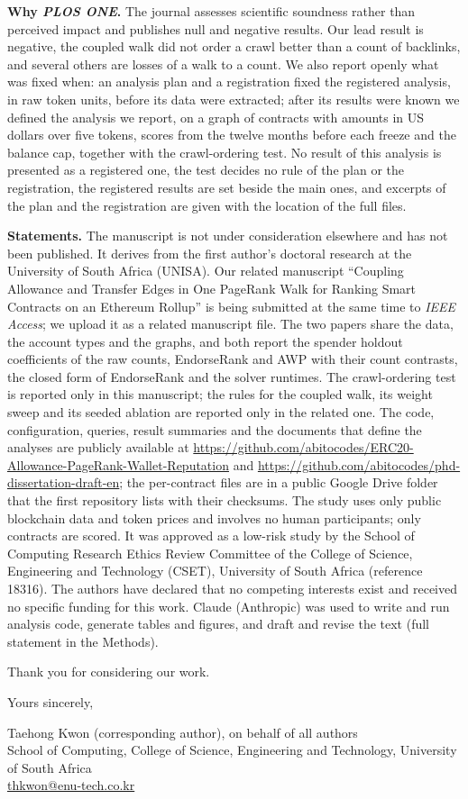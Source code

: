 \documentclass[11pt,a4paper]{article}
\begin{document}
\textbf{Why \textit{PLOS ONE}.} The journal assesses scientific soundness rather than perceived impact and publishes null and negative results. Our lead result is negative, the coupled walk did not order a crawl better than a count of backlinks, and several others are losses of a walk to a count. We also report openly what was fixed when: an analysis plan and a registration fixed the registered analysis, in raw token units, before its data were extracted; after its results were known we defined the analysis we report, on a graph of contracts with amounts in US dollars over five tokens, scores from the twelve months before each freeze and the balance cap, together with the crawl-ordering test. No result of this analysis is presented as a registered one, the test decides no rule of the plan or the registration, the registered results are set beside the main ones, and excerpts of the plan and the registration are given with the location of the full files.

\textbf{Statements.} The manuscript is not under consideration elsewhere and has not been published. It derives from the first author's doctoral research at the University of South Africa (UNISA). Our related manuscript ``Coupling Allowance and Transfer Edges in One PageRank Walk for Ranking Smart Contracts on an Ethereum Rollup'' is being submitted at the same time to \textit{IEEE Access}; we upload it as a related manuscript file. The two papers share the data, the account types and the graphs, and both report the spender holdout coefficients of the raw counts, EndorseRank and AWP with their count contrasts, the closed form of EndorseRank and the solver runtimes. The crawl-ordering test is reported only in this manuscript; the rules for the coupled walk, its weight sweep and its seeded ablation are reported only in the related one. The code, configuration, queries, result summaries and the documents that define the analyses are publicly available at \url{https://github.com/abitocodes/ERC20-Allowance-PageRank-Wallet-Reputation} and \url{https://github.com/abitocodes/phd-dissertation-draft-en}; the per-contract files are in a public Google Drive folder that the first repository lists with their checksums. The study uses only public blockchain data and token prices and involves no human participants; only contracts are scored. It was approved as a low-risk study by the School of Computing Research Ethics Review Committee of the College of Science, Engineering and Technology (CSET), University of South Africa (reference 18316). The authors have declared that no competing interests exist and received no specific funding for this work. Claude (Anthropic) was used to write and run analysis code, generate tables and figures, and draft and revise the text (full statement in the Methods).

Thank you for considering our work.

Yours sincerely,

Taehong Kwon (corresponding author), on behalf of all authors\\
School of Computing, College of Science, Engineering and Technology, University of South Africa\\
\href{mailto:thkwon@enu-tech.co.kr}{thkwon@enu-tech.co.kr}
\end{document}

